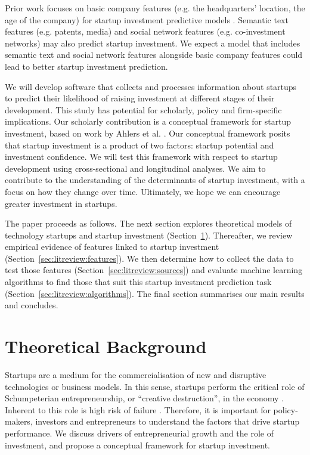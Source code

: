 \documentclass[../thesis/thesis.tex]{subfiles}
\begin{document}
\begin{refsection}
\begin{description}
Prior work focuses on basic company features (e.g. the headquarters' location, the age of the company) for startup investment predictive models \cite{beckwith2016, gimmon2010}. Semantic text features (e.g. patents, media) \cite{hoenen2014, yuan2016} and social network features (e.g. co-investment networks) \cite{werth2013, cheng2016, yu2015} may also predict startup investment. We expect a model that includes semantic text and social network features alongside basic company features could lead to better startup investment prediction.

\end{description}


We will develop software that collects and processes information about startups to predict their likelihood of raising investment at different stages of their development. This study has potential for scholarly, policy and firm-specific implications. Our scholarly contribution is a conceptual framework for startup investment, based on work by Ahlers et al. \cite{ahlers2015}. Our conceptual framework posits that startup investment is a product of two factors: startup potential and investment confidence. We will test this framework with respect to startup development using cross-sectional and longitudinal analyses. We aim to contribute to the understanding of the determinants of startup investment, with a focus on how they change over time. Ultimately, we hope we can encourage greater investment in startups.


The paper proceeds as follows. The next section explores theoretical models of technology startups and startup investment (Section~\ref{sec:litreview:theory}). Thereafter, we review empirical evidence of features linked to startup investment (Section~\ref{sec:litreview:features}). We then determine how to collect the data to test those features (Section~\ref{sec:litreview:sources}) and evaluate machine learning algorithms to find those that suit this startup investment prediction task (Section~\ref{sec:litreview:algorithms}). The final section summarises our main results and concludes.

\section{Theoretical Background}
\label{sec:litreview:theory}

Startups are a medium for the commercialisation of new and disruptive technologies or business models. In this sense, startups perform the critical role of Schumpeterian entrepreneurship, or ``creative destruction'', in the economy \cite{timmons1986}. Inherent to this role is high risk of failure \cite{sahlman2010}. Therefore, it is important for policy-makers, investors and entrepreneurs to understand the factors that drive startup performance. We discuss drivers of entrepreneurial growth and the role of investment, and propose a conceptual framework for startup investment.


\end{refsection}
\end{document}
